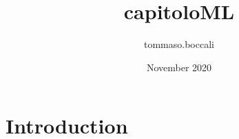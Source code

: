 \documentclass{article}
\title{capitoloML}
\author{tommaso.boccali }
\date{November 2020}
\begin{document}
\maketitle

\section{Introduction}
\end{document}
